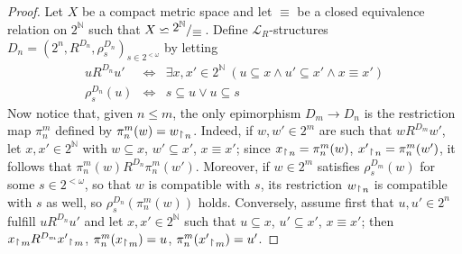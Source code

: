 \documentclass[12pt,twoside,a4paper]{amsart}
\theoremstyle{plain}
\theoremstyle{definition}
\begin{document}
\begin{proof}
Let $X$ be a compact metric space and let $\equiv $ be a closed equivalence relation on $ {2^{\mathbb N}} $ such that $X\backsimeq {{\raisebox{.2em}{${2^{\mathbb N}}\!$}\left/\raisebox{-.2em}{${\equiv }$}\right.}}$.
Define $ \mathcal L_R$-structures $D_n=(2^n,R^{D_n},\rho_s^{D_n})_{s\in 2^{<\omega }}$ by letting
\[
\begin{array}{lcl}
uR^{D_n}u' & \Leftrightarrow & \exists x,x'\in {2^{\mathbb N}}\ (u\subseteq x\wedge u'\subseteq x'\wedge x\equiv x') \\
\rho_s^{D_n}(u) & \Leftrightarrow & s\subseteq u\vee u\subseteq s
\end{array}
\]
Now notice that, given $n\leq m$, the only epimorphism $D_m\to D_n$ is the restriction map $\pi_n^m$ defined by $\pi_n^m(w)=w {\, _{{\begin{tikzpicture}[{}]\draw (0,-0.5pt) -- (0,5pt);\draw (0,5pt) -- (1.5pt,3.5pt);\end{tikzpicture}}\, n}}$.
Indeed, if $w,w'\in 2^m$ are such that $wR^{D_m}w'$, let $x,x'\in {2^{\mathbb N}} $ with $w\subseteq x$, $w'\subseteq x'$, $x\equiv x'$; since $x {\, _{{\begin{tikzpicture}[{}]\draw (0,-0.5pt) -- (0,5pt);\draw (0,5pt) -- (1.5pt,3.5pt);\end{tikzpicture}}\, n}}=\pi_n^m(w)$, $x' {\, _{{\begin{tikzpicture}[{}]\draw (0,-0.5pt) -- (0,5pt);\draw (0,5pt) -- (1.5pt,3.5pt);\end{tikzpicture}}\, n}}=\pi_n^m(w')$, it follows that $\pi_n^m(w)R^{D_n}\pi_n^m(w')$.
Moreover, if $w\in 2^m$ satisfies $\rho_s^{D_m}(w)$ for some $s\in 2^{<\omega }$, so that $w$ is compatible with $s$, its restriction $w {\, _{{\begin{tikzpicture}[{}]\draw (0,-0.5pt) -- (0,5pt);\draw (0,5pt) -- (1.5pt,3.5pt);\end{tikzpicture}}\, n}}$ is compatible with $s$ as well, so $\rho_s^{D_n}(\pi_n^m(w))$ holds.
Conversely, assume first that $u,u'\in 2^n$ fulfill $uR^{D_n}u'$ and let $x,x'\in {2^{\mathbb N}} $ such that $u\subseteq x$, $u'\subseteq x'$, $x\equiv x'$; then $x {\, _{{\begin{tikzpicture}[{}]\draw (0,-0.5pt) -- (0,5pt);\draw (0,5pt) -- (1.5pt,3.5pt);\end{tikzpicture}}\, m}}R^{D_m}x' {\, _{{\begin{tikzpicture}[{}]\draw (0,-0.5pt) -- (0,5pt);\draw (0,5pt) -- (1.5pt,3.5pt);\end{tikzpicture}}\, m}}$, $\pi_n^m(x {\, _{{\begin{tikzpicture}[{}]\draw (0,-0.5pt) -- (0,5pt);\draw (0,5pt) -- (1.5pt,3.5pt);\end{tikzpicture}}\, m}})=u$, $\pi_n^m(x' {\, _{{\begin{tikzpicture}[{}]\draw (0,-0.5pt) -- (0,5pt);\draw (0,5pt) -- (1.5pt,3.5pt);\end{tikzpicture}}\, m}})=u'$.

\end{proof}
\end{document}
